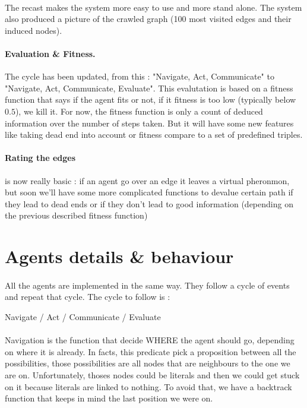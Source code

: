 \documentclass{article}
\begin{document}
		\paragraph{} The recast makes the system more easy to use and more stand alone.
			The system also produced a picture of the crawled graph (100 most visited edges and their induced nodes).
		\paragraph{Evaluation \& Fitness.} The cycle has been updated, from this :
			"Navigate, Act, Communicate" to "Navigate, Act, Communicate, Evaluate".
			This evalutation is based on a fitness function that says if the agent fits or not,
			if it fitness is too low (typically below $0.5$), we kill it.
			For now, the fitness function is only a count of deduced information over the number of steps taken.
			But it will have some new features like taking dead end into account or
			fitness compare to a set of predefined triples.
		\paragraph{Rating the edges} is now really basic : if an agent go over an edge it leaves a virtual pheronmon,
			but soon we'll have some more complicated functions to devalue certain path if they lead to dead ends or
			if they don't lead to good information (depending on the previous described fitness function)

\section{Agents details \& behaviour}
	\paragraph{}
		All the agents are implemented in the same way.
		They follow a cycle of events and repeat that cycle.
		The cycle to follow is :
	\begin{center}
		Navigate / Act / Communicate / Evaluate
	\end{center}
	\paragraph{}
		Navigation is the function that decide WHERE the agent should go, depending on where it is already.
		In facts, this predicate pick a proposition between all the possibilities,
		those possibilities are all nodes that are neighbours to the one we are on.
		Unfortunately, thoses nodes could be literals and then we could get stuck on it because literals are linked to nothing.
		To avoid that, we have a backtrack function that keeps in mind the last position we were on.
\end{document}
